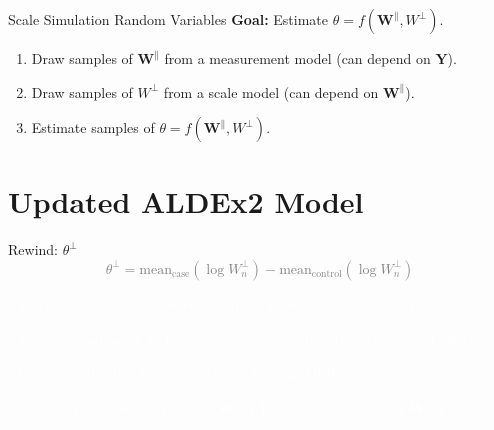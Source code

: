 \documentclass[
  ignorenonframetext,
]{beamer}
\begin{document}
\begin{frame}{Scale Simulation Random Variables}
\protect\hypertarget{scale-simulation-random-variables}{}
\textbf{Goal:} Estimate \(\theta = f(\mathbf{W}^\parallel, W^\perp)\).

\vspace{.25in}

\begin{enumerate}
\item
  Draw samples of \(\mathbf{W}^{\parallel}\) from a measurement model
  (can depend on \(\mathbf{Y}\)).
\item
  Draw samples of \(W^{\perp}\) from a scale model (can depend on
  \(\mathbf{W}^{\parallel}\)).
\item
  Estimate samples of \(\theta = f(\mathbf{W}^\parallel, W^\perp)\).
\end{enumerate}
\end{frame}

\hypertarget{updated-aldex2-model}{%
\section{Updated ALDEx2 Model}\label{updated-aldex2-model}}

\begin{frame}{Rewind: \(\theta^\perp\)}
\protect\hypertarget{rewind-thetaperp}{}
\textcolor{gray}{\begin{equation*}
\theta^\perp = \text{mean}_{\text{case}}(\log W_{n}^\perp) - \text{mean}_{\text{control}}(\log W_{n}^\perp)
\end{equation*}}

\vspace{.1in}

\textcolor{white}{- The change in scales between conditions matters for estimating LFCs.}

\textcolor{white}{- The scale only needs to be known up to a constant (see Nixon et. al (2023)).}

\textcolor{white}{- Each normalization implies a value of $\theta^\perp$ \textcolor{white}{(e.g., CLR):}}

\textcolor{white}{\begin{equation*}
\theta^\perp_{\text{CLR}} = \text{mean}_{\text{case}}(-\text{GM}( \mathbf{W}_{\cdot n}^\parallel)) - \text{mean}_{\text{control}}(-\text{GM}( \mathbf{W}_{\cdot n}^\parallel)) 
\end{equation*}}
\end{frame}
\end{document}
